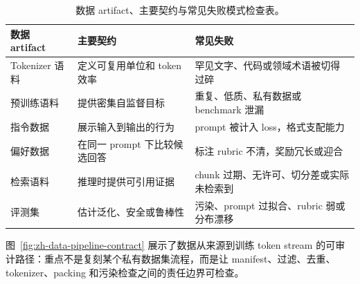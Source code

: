 \documentclass[UTF8,zihao=-4,openany]{ctexbook}
\begin{document}
\begin{table}[t]
\centering
\begin{tabular}{p{}p{}p{}}
\toprule
数据 artifact & 主要契约 & 常见失败 \\
\midrule
Tokenizer 语料 & 定义可复用单位和 token 效率 & 罕见文字、代码或领域术语被切得过碎 \\
预训练语料 & 提供密集自监督目标 & 重复、低质、私有数据或 benchmark 泄漏 \\
指令数据 & 展示输入到输出的行为 & prompt 被计入 loss，格式支配能力 \\
偏好数据 & 在同一 prompt 下比较候选回答 & 标注 rubric 不清，奖励冗长或迎合 \\
检索语料 & 推理时提供可引用证据 & chunk 过期、无许可、切分差或实际未检索到 \\
评测集 & 估计泛化、安全或鲁棒性 & 污染、prompt 过拟合、rubric 弱或分布漂移 \\
\bottomrule
\end{tabular}
\caption{数据 artifact、主要契约与常见失败模式检查表。}
\label{tab:zh-data-artifact-contracts}
\end{table}

图~\ref{fig:zh-data-pipeline-contract} 展示了数据从来源到训练 token stream 的可审计路径：重点不是复刻某个私有数据集流程，而是让 manifest、过滤、去重、tokenizer、packing 和污染检查之间的责任边界可检查。
\end{document}
